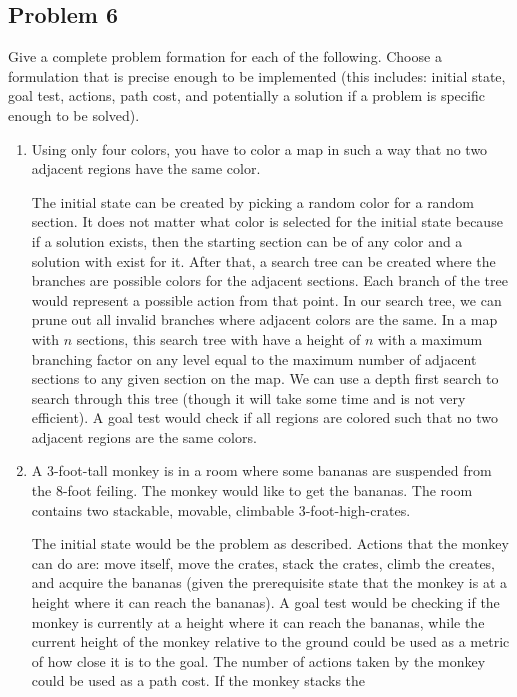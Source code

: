 \documentclass{math}
\begin{document}
\subsection*{Problem 6}
Give a complete problem formation for each of the following. Choose a
formulation that is precise enough to be implemented (this includes: initial
state, goal test, actions, path cost, and potentially a solution if a problem
is specific enough to be solved).
\begin{enumerate}
  \item Using only four colors, you have to color a map in such a way that no
  two adjacent regions have the same color.
  \par The initial state can be created by picking a random color for a random
  section.  It does not matter what color is selected for the initial state
  because if a solution exists, then the starting section can be of any color
  and a solution with exist for it. After that, a search tree can be created
  where the branches are possible colors for the adjacent sections. Each branch
  of the tree would represent a possible action from that point. In our
  search tree, we can prune out all invalid branches where adjacent colors are
  the same. In a map with \( n \) sections, this search tree with have a height
  of \( n \) with a maximum branching factor on any level equal to the maximum
  number of adjacent sections to any given section on the map. We can use a
  depth first search to search through this tree (though it will take some
  time and is not very efficient). A goal test would check if all regions are
  colored such that no two adjacent regions are the same colors.
  \item A 3-foot-tall monkey is in a room where some bananas are suspended from
  the 8-foot feiling. The monkey would like to get the bananas. The room
  contains two stackable, movable, climbable 3-foot-high-crates.
  \par The initial state would be the problem as described. Actions that the
  monkey can do are: move itself, move the crates, stack the crates, climb the
  creates, and acquire the bananas (given the prerequisite state that the
  monkey is at a height where it can reach the bananas). A goal test would be
  checking if the monkey is currently at a height where it can reach the
  bananas, while the current height of the monkey relative to the ground could
  be used as a metric of how close it is to the goal. The number of actions
  taken by the monkey could be used as a path cost. If the monkey stacks the

\end{enumerate}
\end{document}
